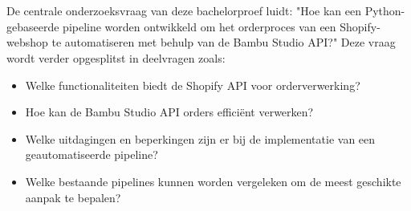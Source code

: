 
\section{}%
\label{sec:onderzoeksvraag}

De centrale onderzoeksvraag van deze bachelorproef luidt: "Hoe kan een Python-gebaseerde pipeline worden ontwikkeld om het orderproces van een Shopify-webshop te automatiseren met behulp van de Bambu Studio API?" Deze vraag wordt verder opgesplitst in deelvragen zoals:

\begin{itemize}
    \item Welke functionaliteiten biedt de Shopify API voor orderverwerking?
    \item Hoe kan de Bambu Studio API orders efficiënt verwerken?
    \item Welke uitdagingen en beperkingen zijn er bij de implementatie van een geautomatiseerde pipeline?
    \item Welke bestaande pipelines kunnen worden vergeleken om de meest geschikte aanpak te bepalen?
\end{itemize}


\section{}%
\label{sec:onderzoeksdoelstelling}

